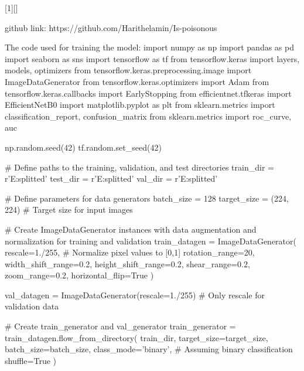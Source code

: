 [1][]{
}{}

\begin{python}[caption={Python code for training the model}]
github link: https://github.com/Harithelamin/Is-poisonous

The code used for training the model:
import numpy as np
import pandas as pd
import seaborn as sns
import tensorflow as tf
from tensorflow.keras import layers, models, optimizers
from tensorflow.keras.preprocessing.image import ImageDataGenerator
from tensorflow.keras.optimizers import Adam
from tensorflow.keras.callbacks import EarlyStopping
from efficientnet.tfkeras import EfficientNetB0
import matplotlib.pyplot as plt
from sklearn.metrics import classification_report, confusion_matrix
from sklearn.metrics import roc_curve, auc



np.random.seed(42)
tf.random.set_seed(42)

# Define paths to the training, validation, and test directories
train_dir = r'E:\Amazon\ml\original splitted\train'
test_dir = r'E:\Amazon\ml\original splitted\test'
val_dir = r'E:\Amazon\ml\original splitted\val'


# Define parameters for data generators
batch_size = 128
target_size = (224, 224)  # Target size for input images

# Create ImageDataGenerator instances with data augmentation and normalization for training and validation
train_datagen = ImageDataGenerator(
    rescale=1./255,  # Normalize pixel values to [0,1]
    rotation_range=20,
    width_shift_range=0.2,
    height_shift_range=0.2,
    shear_range=0.2,
    zoom_range=0.2,
    horizontal_flip=True
)

val_datagen = ImageDataGenerator(rescale=1./255)  # Only rescale for validation data

# Create train_generator and val_generator
train_generator = train_datagen.flow_from_directory(
    train_dir,
    target_size=target_size,
    batch_size=batch_size,
    class_mode='binary',  # Assuming binary classification
    shuffle=True
)


\end{python}
